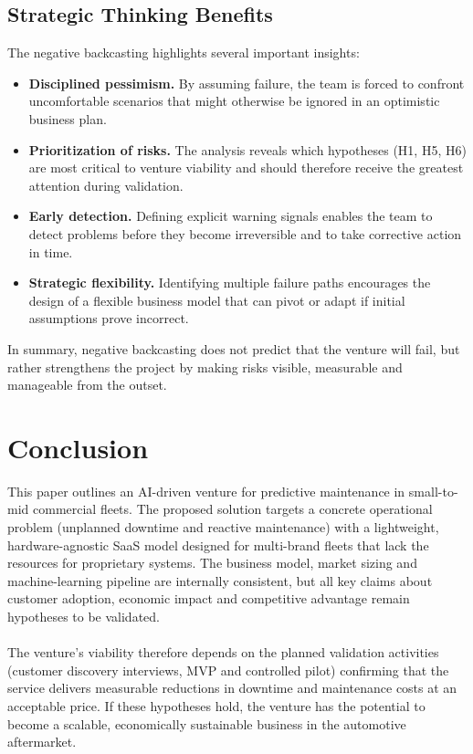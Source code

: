 \documentclass[11pt,a4paper]{article}
\begin{document}
\subsection{Strategic Thinking Benefits}
\noindent The negative backcasting  highlights several important insights:
\begin{itemize}
    \item \textbf{Disciplined pessimism.} By assuming failure, the team is forced to confront uncomfortable scenarios that might otherwise be ignored in an optimistic business plan.
    \item \textbf{Prioritization of risks.} The analysis reveals which hypotheses (H1, H5, H6) are most critical to venture viability and should therefore receive the greatest attention during validation.
    \item \textbf{Early detection.} Defining explicit warning signals enables the team to detect problems before they become irreversible and to take corrective action in time.
    \item \textbf{Strategic flexibility.} Identifying multiple failure paths encourages the design of a flexible business model that can pivot or adapt if initial assumptions prove incorrect.
\end{itemize}
\noindent In summary, negative backcasting does not predict that the venture will fail, but rather strengthens the project by making risks visible, measurable and manageable from the outset. 

\section{Conclusion}

This paper outlines an AI-driven venture for predictive maintenance in small-to-mid commercial fleets. The proposed solution targets a concrete operational problem (unplanned downtime and reactive maintenance) with a lightweight, hardware-agnostic SaaS model designed for multi-brand fleets that lack the resources for proprietary systems. The business model, market sizing and machine-learning pipeline are internally consistent, but all key claims about customer adoption, economic impact and competitive advantage remain hypotheses to be validated.
\\
\\ The venture’s viability therefore depends on the planned validation activities (customer discovery interviews, MVP and controlled pilot) confirming that the service delivers measurable reductions in downtime and maintenance costs at an acceptable price. If these hypotheses hold, the venture has the potential to become a scalable, economically sustainable business in the automotive aftermarket.
\end{document}
